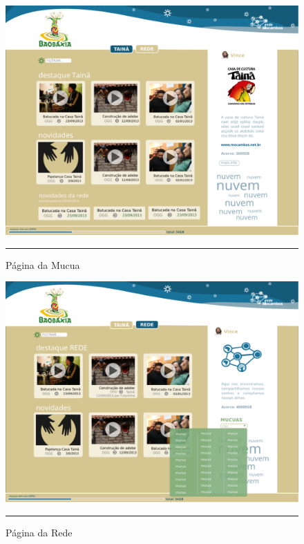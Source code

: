 \begin{figure}[htbp]
  \centering
  \includegraphics[width=\textwidth]{./Fig/layout-pgMUCUA.pdf}
  \rule{35em}{0.5pt}
  \caption[Página da Mucua]{Página da Mucua}
  \label{fig:layout-pgMUCUA}
\end{figure}

\begin{figure}[htbp]
  \centering
  \includegraphics[width=\textwidth]{./Fig/layout-pgREDE.pdf}
  \rule{35em}{0.5pt}
  \caption[Página da Rede]{Página da Rede}
  \label{fig:layout-pgREDE}
\end{figure}

